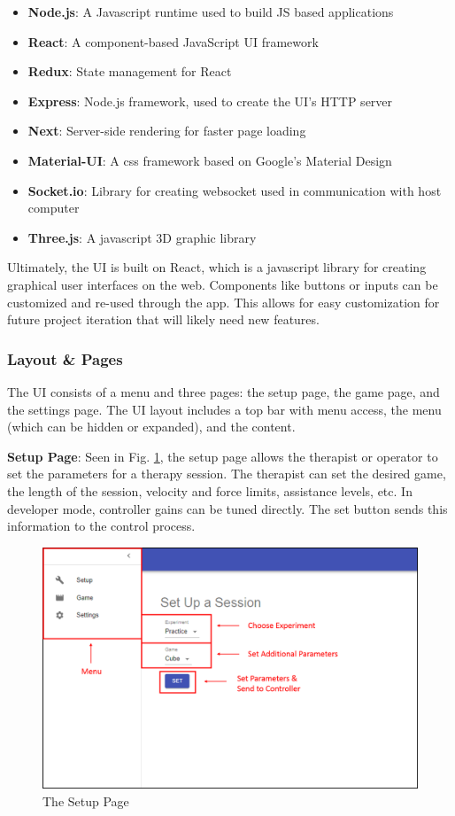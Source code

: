 \documentclass[12pt]{report}
\begin{document}
	\begin{itemize}
		\item \textbf{Node.js}: A Javascript runtime used to build JS based applications 		
		\item \textbf{React}: A component-based JavaScript UI framework
		\item \textbf{Redux}: State management for React
		\item \textbf{Express}: Node.js framework, used to create the UI's HTTP server
		\item \textbf{Next}: Server-side rendering for faster page loading
		\item \textbf{Material-UI}: A css framework based on Google's Material Design
		\item \textbf{Socket.io}: Library for creating websocket used in communication with host computer
		\item \textbf{Three.js}: A javascript 3D graphic library 
	\end{itemize}
	
	
	Ultimately, the UI is built on React, which is a javascript library for creating graphical user interfaces on the web. Components like buttons or inputs can be customized and re-used through the app. This allows for easy customization for future project iteration that will likely need new features. 
	
		\subsubsection{Layout \& Pages}

The UI consists of a menu and three pages: the setup page, the game page, and the settings page. The UI layout includes a top bar with menu access, the menu (which can be hidden or expanded), and the content. 

\textbf{Setup Page}: Seen in Fig. \ref{fig:ui-menu}, the setup page allows the therapist or operator to set the parameters for a therapy session. The therapist can set the desired game, the length of the session, velocity and force limits, assistance levels, etc. In developer mode, controller gains can be tuned directly. The set button sends this information to the control process. 

	\begin{figure}[h] 
		\centering
		\includegraphics[width=0.9\linewidth]{UI_menu_label}
		\caption{The Setup Page}
		\label{fig:ui-menu}
	\end{figure} 	
		
\end{document}
